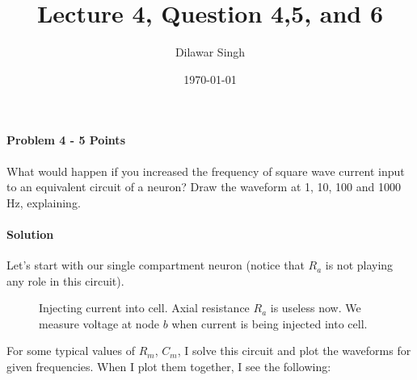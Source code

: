 \documentclass[a4paper,10pt]{article}
\title{Lecture 4, Question 4,5, and 6}
\author{Dilawar Singh}
\date{\today}
\begin{document}
\maketitle

\paragraph{Problem 4 - 5 Points}
\label{par:Problem 4}
What would happen if you increased the frequency of square wave current input to 
an equivalent circuit of a neuron? Draw the waveform at 1, 10, 100 and 1000 Hz, 
explaining.

\paragraph{Solution} Let's start with our single compartment neuron (notice that
$R_a$ is not playing any role in this circuit).

\begin{figure}[h]
    \usetikzlibrary{shapes,shadows,circuits.ee.IEC}
    \centering
    \caption{Injecting current into cell. Axial resistance $R_a$ is useless now.
    We measure voltage at node $b$ when current is being injected into cell.}
    \label{fig:sphere}
\end{figure}

For some typical values of $R_m$, $C_m$, I solve this circuit and plot the
waveforms for given frequencies. When I plot them together, I see the following:
\end{document}
